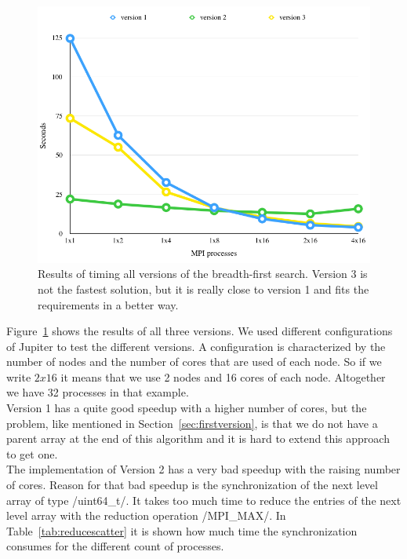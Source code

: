 \documentclass[12pt,a4paper]{article}
\begin{document}
\begin{figure}[!ht]
   \centering
   \includegraphics[width=1.00\textwidth]{allversions}
   \caption{Results of timing all versions of the breadth-first search. Version 3 is not the fastest solution, but it is really close to version 1 and fits the requirements in a better way.}
   \label{fig:allversions}
\end{figure}
Figure~\ref{fig:allversions} shows the results of all three versions. We used different configurations of Jupiter to test the different versions. A configuration is characterized by the number of nodes and the number of cores that are used of each node. So if we write \(2x16\) it means that we use 2 nodes and 16 cores of each node. Altogether we have 32 processes in that example.\\
Version 1 has a quite good speedup with a higher number of cores, but the problem, like mentioned in Section~\ref{sec:firstversion}, is that we do not have a parent array at the end of this algorithm and it is hard to extend this approach to get one.\\
The implementation of Version 2 has a very bad speedup with the raising number of cores. Reason for that bad speedup is the synchronization of the next level array of type \cinline/uint64_t/. It takes too much time to reduce the entries of the next level array with the reduction operation \cinline/MPI_MAX/. In Table~\ref{tab:reducescatter} it is shown how much time the synchronization consumes for the different count of processes.\\
\end{document}
